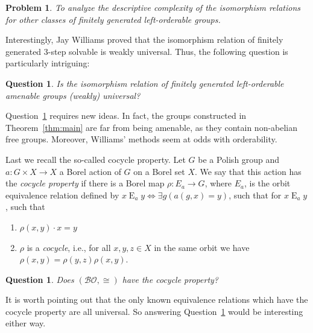 \documentclass{amsart}
\newtheorem{question}[theorem]{Question}
\newtheorem{problem}[theorem]{Problem}
\theoremstyle{definition}
\theoremstyle{remark}
\begin{document}
\begin{problem}
    To analyze the descriptive complexity of the isomorphism relations for other classes of finitely generated left-orderable groups.
\end{problem}

Interestingly, Jay Williams \cite{Wil15} proved that the isomorphism relation of finitely generated \(3\)-step solvable is weakly universal. Thus, the following question is particularly intriguing:

\begin{question}
\label{question : amenable}
    Is the isomorphism relation of finitely generated left-orderable amenable groups (weakly) universal?
\end{question}

Question~\ref{question : amenable} requires new ideas.
In fact, the groups constructed in Theorem~\ref{thm:main} are far from being amenable, as they contain non-abelian free groups. Moreover, Williams' methods seem at odds with orderability.

Last we recall the so-called cocycle property.
Let \(G\) be a Polish group and \(a\colon G\times X \to X\) a Borel action of \(G\) on a Borel set \(X\). We say that this action has the \emph{cocycle property} if there is a Borel map \(\rho\colon E_a \to G\), where \(E_a\), is the orbit equivalence relation defined by \(x\mathbin{E}_ay \iff \exists g(a(g , x) = y)\), such that for \(x\mathbin{E}_ay\), such that 
\begin{enumerate}
\item
\(\rho(x, y)\cdot x=y\)
\item
\(\rho\) is a \emph{cocycle}, i.e., for all \(x,y,z\in X\) in the same orbit we have \(\rho(x, y)=\rho(y, z)\rho(x, y)\).
\end{enumerate}

\begin{question}
\label{question : cocycle property}
    Does \((\mathcal{BO}, \cong)\) have the cocycle property?
\end{question}

It is worth pointing out that the only known equivalence relations which have the cocycle property are all universal. So answering Question~\ref{question : cocycle property} would be interesting either way.
\end{document}
